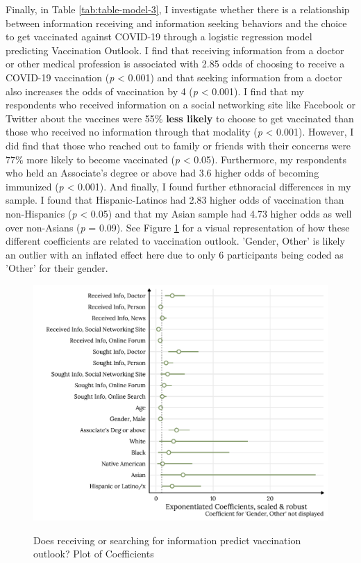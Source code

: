 Finally, in Table \ref{tab:table-model-3}, I investigate whether there is a
relationship between information receiving and information seeking behaviors and
the choice to get vaccinated against COVID-19 through a logistic regression
model predicting Vaccination Outlook. I find that receiving information from a
doctor or other medical profession is associated with 2.85 odds of choosing to
receive a COVID-19 vaccination (\emph{p} \textless{} 0.001) and that seeking
information from a doctor also increases the odds of vaccination by 4 (\emph{p}
\textless{} 0.001). I find that my respondents who received information on a
social networking site like Facebook or Twitter about the vaccines were 55\%
\textbf{less likely} to choose to get vaccinated than those who received no
information through that modality (\emph{p} \textless{} 0.001). However, I did
find that those who reached out to family or friends with their concerns were
77\% more likely to become vaccinated (\emph{p} \textless{} 0.05). Furthermore,
my respondents who held an Associate's degree or above had 3.6 higher odds of
becoming immunized (\emph{p} \textless{} 0.001). And finally, I found further
ethnoracial differences in my sample. I found that Hispanic-Latinos had 2.83
higher odds of vaccination than non-Hispanics (\emph{p} \textless{} 0.05) and
that my Asian sample had 4.73 higher odds as well over non-Asians (\emph{p}  =
0.09). See Figure \ref{fig:plot-model-3} for a visual representation of how
these different coefficients are related to vaccination outlook. 'Gender, Other'
is likely an outlier with an inflated effect here due to only 6 participants
being coded as 'Other' for their gender. 

\begin{figure}[h]
{\centering \includegraphics[width=0.8\linewidth]{figs/paper2/plot-model-3-1}}
\caption{Does receiving or searching for information predict vaccination outlook? Plot of Coefficients}\label{fig:plot-model-3}
\end{figure}


